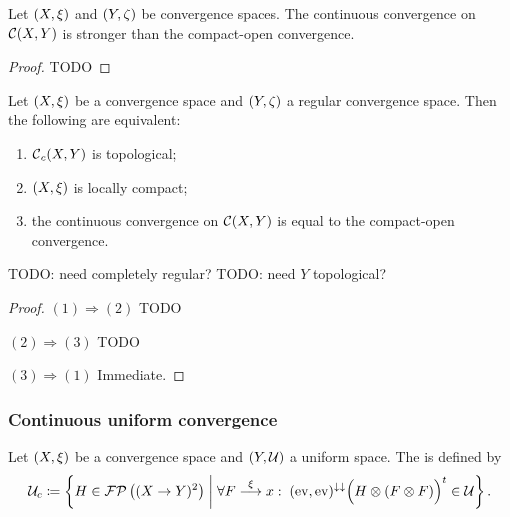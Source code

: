 \begin{proposition}
Let $\left( X,\xi \right)$ and $\left( Y,\zeta \right)$ be convergence spaces. The continuous convergence on $\operatorname{\mathcal{C}}(X,Y)$ is stronger than the compact-open convergence.
\end{proposition}
\begin{proof}
TODO
\end{proof}

\begin{proposition}
Let $\left( X,\xi \right)$ be a convergence space and $\left( Y,\zeta \right)$ a regular convergence space. Then the following are equivalent:
\begin{enumerate}
\item $\operatorname{\mathcal{C}}_c(X,Y)$ is topological;
\item $\left( X,\xi \right)$ is locally compact;
\item the continuous convergence on $\operatorname{\mathcal{C}}(X,Y)$ is equal to the compact-open convergence.
\end{enumerate}
\end{proposition}
TODO: need completely regular? TODO: need $Y$ topological?
\begin{proof}
$(1) \Rightarrow (2)$ TODO

$(2) \Rightarrow (3)$ TODO

$(3) \Rightarrow (1)$ Immediate.
\end{proof}

\subsubsection{Continuous uniform convergence}
\begin{definition}
Let $\left( X, \xi \right)$ be a convergence space and $\left( Y, \mathcal{U} \right)$ a uniform space. The  is defined by
\[ \mathcal{U}_c \coloneqq \left\{ H\in \operatorname{\mathcal{FP}}\big((X\to Y)^2\big) \;\middle|\; \forall F\overset{\xi}{\longrightarrow} x:\; (\operatorname{ev}, \operatorname{ev})^{\downarrow\downarrow}\Big(H\otimes (F\otimes F)\Big)^t \in \mathcal{U} \right\}. \]
\end{definition}

